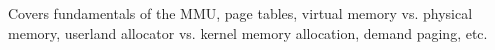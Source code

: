 Covers fundamentals of the MMU, page tables, virtual memory vs. physical memory,
userland allocator vs. kernel memory allocation, demand paging, etc.\\

